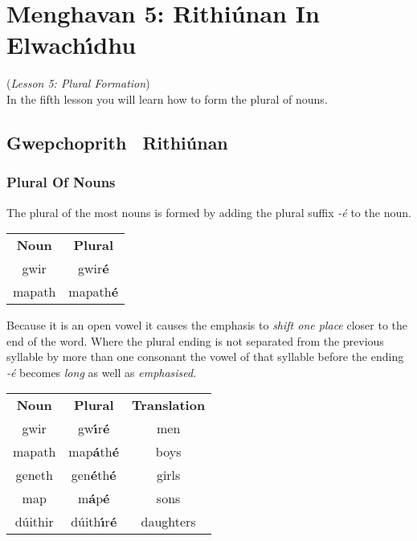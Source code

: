 \section{Menghavan 5: Rithi\'{u}nan In Elwach\'{\i}dhu}
(\textit{Lesson 5: Plural Formation})\\

In the fifth lesson you will learn how to form the plural of nouns.\\

\subsection{Gwepchoprith \textendash\ Rithi\'{u}nan}
\subsubsection{Plural Of Nouns}

The plural of the most nouns is formed by adding the plural suffix \textit{-\'{e}} to the noun.
\begin{table}[H]
\centering
\begin{tabular}{cc}
  \toprule
  \textbf{Noun} & \textbf{Plural}\\
  \cmidrule(lr){1-1}\cmidrule(lr){2-2}
  gwir & gwir\textbf{\'{e}}\\
  mapath & mapath\textbf{\'{e}}\\
  \bottomrule
\end{tabular}
\label{example_noun_plural}
\end{table}

Because it is an open vowel it causes the emphasis to \textit{shift one place} closer to the end of the word. Where the plural ending is not separated from the previous syllable by more than one consonant the vowel of that syllable before the ending \textit{-\'{e}} becomes \textit{long} as well as \textit{emphasised}.
\begin{table}[H]
\centering
\begin{tabular}{ccc}
  \toprule
  \textbf{Noun} & \textbf{Plural} & \textbf{Translation}\\
  \cmidrule(lr){1-1}\cmidrule(lr){2-2}\cmidrule(lr){3-3}
  gwir & gw\textbf{\'{\i}}r\textbf{\'{e}} & men\\
  mapath & map\textbf{\'{a}}th\textbf{\'{e}} & boys\\
  geneth & gen\textbf{\'{e}}th\textbf{\'{e}} & girls\\
  map & m\textbf{\'{a}}p\textbf{\'{e}} & sons\\
  d\'{u}ithir & d\'{u}ith\textbf{\'{\i}}r\textbf{\'{e}} & daughters\\
  \bottomrule
\end{tabular}
\label{example_emphasis_shift}
\end{table}

